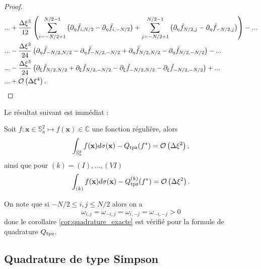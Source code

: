 \begin{proof}
\begin{align*}
& ... + \dfrac{\Delta \xi^3}{12} \left( \displaystyle\sum\limits_{i=-N/2+1}^{N/2-1} \left( \partial_{\eta}\tilde{f}_{i, N/2} - \partial_{\eta}\tilde{f}_{i, -N/2} \right) + \displaystyle\sum\limits_{j=-N/2+1}^{N/2-1} \left( \partial_{\eta}\tilde{f}_{N/2,j} - \partial_{\eta}\tilde{f}_{-N/2,j} \right) \right) - ...  \\
	&  ... - \dfrac{\Delta \xi^3}{24} \left( \partial_{\eta}\tilde{f}_{-N/2,N/2} - \partial_{\eta}\tilde{f}_{-N/2,-N/2} + \partial_{\eta}\tilde{f}_{N/2,N/2}  - \partial_{\eta}\tilde{f}_{N/2,-N/2} \right) - ...  \\
& ... - \dfrac{\Delta \xi^3}{24} \left( \partial_{\xi}\tilde{f}_{N/2,N/2} + \partial_{\xi}\tilde{f}_{N/2,-N/2} - \partial_{\xi}\tilde{f}_{-N/2,N/2}  - \partial_{\xi}\tilde{f}_{-N/2,-N/2} \right)+...\\
& ... + \mathcal{O} \left( \Delta \xi^4 \right).
\end{align*}
\end{proof}

Le résultat suivant est immédiat :
\begin{corollaire}
Soit $f : \mathbf{x} \in \mathbb{S}_a^2 \mapsto f(\mathbf{x}) \in \mathbb{C}$ une fonction régulière, alors
\begin{equation}
\displaystyle\int_{\mathbb{S}_a^2} f(\mathbf{x}) d\sigma(\mathbf{x}) - Q_{\text{tpz}}(f^*) = \mathcal{O} \left( \Delta \xi^2 \right),
\end{equation}
ainsi que pour $(k) = (I), ..., (VI)$
\begin{equation}
\displaystyle\int_{(k)} f(\mathbf{x}) d\sigma(\mathbf{x}) - Q_{\text{tpz}}^{(k)}(f^*) = \mathcal{O} \left( \Delta \xi^2 \right).
\end{equation}
\end{corollaire}

\begin{remarque}
On note que si $-N/2 \leq i,j \leq N/2$ alors on a 
\begin{equation}
\omega_{i,j} = \omega_{-i,j} = \omega_{i,-j} = \omega_{-i,-j} > 0
\end{equation}
donc le corollaire \ref{cor:quadrature_exacte} est vérifié pour la formule de quadrature $Q_{\text{tpz}}$.
\end{remarque}











\subsection{Quadrature de type Simpson}

